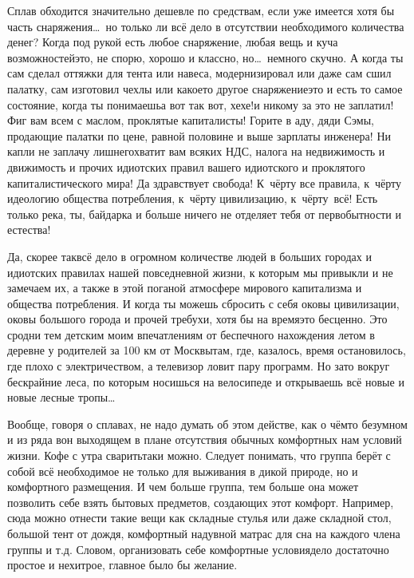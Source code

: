 Сплав обходится значительно дешевле по средствам, если уже имеется хотя бы часть снаряжения\ldots~но только ли всё дело в отсутствии необходимого количества денег? Когда под рукой есть любое снаряжение, любая вещь и куча возможностей\mdash это, не спорю, хорошо и классно, но\ldots~немного скучно. А когда ты сам сделал оттяжки для тента или навеса, модернизировал или даже сам сшил палатку, сам изготовил чехлы или какое\sdash то другое снаряжение\mdash это и есть то самое состояние, когда ты понимаешь\mdash а вот так вот, хе\sdash хе!\mdash и никому за это не заплатил! Фиг вам всем с маслом, проклятые капиталисты! Горите в аду, дяди Сэмы, продающие палатки по цене, равной половине и выше зарплаты инженера!  Ни капли не заплачу лишнего\mdash хватит вам всяких НДС, налога на недвижимость и движимость и прочих идиотских правил вашего идиотского и проклятого капиталистического мира! Да здравствует свобода! К~чёрту все правила, к~чёрту идеологию общества потребления, к~чёрту цивилизацию, к~чёрту~всё! Есть только река, ты, байдарка и больше ничего не отделяет тебя от первобытности и естества! 

Да, скорее так\mdash всё дело в огромном количестве людей в больших городах и идиотских правилах нашей повседневной жизни, к которым мы привыкли и не замечаем их, а также в этой поганой атмосфере мирового капитализма и общества потребления. И когда ты можешь сбросить с себя оковы цивилизации, оковы большого города и прочей требухи, хотя бы на время\mdash это бесценно. Это сродни тем детским моим впечатлениям от беспечного нахождения летом в деревне у родителей за 100 км от Москвы\mdash там, где, казалось, время остановилось, где плохо с электричеством, а телевизор ловит пару программ. Но зато вокруг бескрайние леса, по которым носишься на велосипеде и открываешь всё новые и новые лесные тропы\ldots 

Вообще, говоря о сплавах, не надо думать об этом действе, как о чём\sdash то безумном и из ряда вон выходящем в плане отсутствия обычных комфортных нам условий жизни. Кофе с утра сварить\sdash таки можно. Следует понимать, что группа берёт с собой всё необходимое не только для выживания в дикой природе, но и комфортного размещения. И чем больше группа, тем больше она может позволить себе взять бытовых предметов, создающих этот комфорт. Например, сюда можно отнести такие вещи как складные стулья или даже складной стол, большой тент от дождя, комфортный надувной матрас для сна на каждого члена группы и т.д. Словом, организовать себе комфортные условия\mdash дело достаточно простое и нехитрое, главное было бы желание. 

